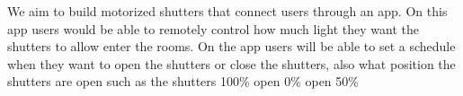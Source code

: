 We aim to build motorized shutters that connect users through an app. On this app users would be able to remotely control how much light they want the shutters to allow enter the rooms. On the app users will be able to set a schedule when they want to open the shutters or close the shutters, also what position the shutters are open such as the shutters 100\% open 0\% open 50\%